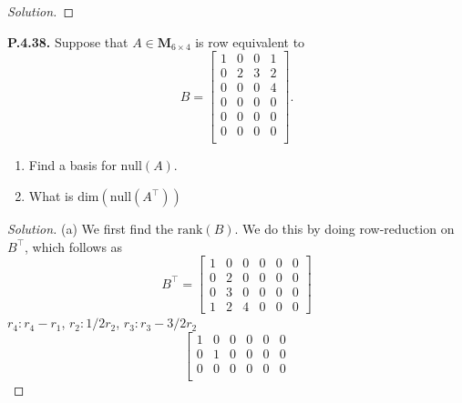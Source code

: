 \documentclass[12pt]{amsart}
\newenvironment{solution}
{\begin{proof}[Solution]}
{\end{proof}}
\begin{document}
\begin{onehalfspace}
\begin{solution}
        \end{solution}

        \noindent\textbf{P.4.38.} Suppose that $A\in\mathbf{M}_{6\times 4}$ is row equivalent to
        \begin{displaymath}
            B = \left[\begin{matrix}
                          1 & 0 & 0 & 1\\
                          0 & 2 & 3 & 2\\
                          0 & 0 & 0 & 4\\
                          0 & 0 & 0 & 0\\
                          0 & 0 & 0 & 0\\
                          0 & 0 & 0 & 0\\
            \end{matrix}\right].
        \end{displaymath}
        \begin{enumerate}[label=(\alph*)]
            \item Find a basis for $\text{null}(A)$.
            \item What is $\text{dim}(\text{null}(A^\top))$
        \end{enumerate}
        \begin{solution}
            (a) We first find the $\text{rank}(B)$.
            We do this by doing row-reduction on $B^\top$, which follows as
            \begin{displaymath}
                B^{\top} =
                \left[\begin{matrix}
                          1 & 0 & 0 & 0 & 0 & 0\\
                          0 & 2 & 0 & 0 & 0 & 0\\
                          0 & 3 & 0 & 0 & 0 & 0\\
                          1 & 2 & 4 & 0 & 0 & 0
                \end{matrix}\right]
            \end{displaymath}
            $r_4:r_4-r_1$, $r_2:1/2r_2$, $r_3:r_3 - 3/2r_2$
            \begin{displaymath}
                \left[\begin{matrix}
                          1 & 0 & 0 & 0 & 0 & 0\\
                          0 & 1 & 0 & 0 & 0 & 0\\
                          0 & 0 & 0 & 0 & 0 & 0\\

\end{matrix}
\end{displaymath}
\end{solution}
\end{onehalfspace}
\end{document}
